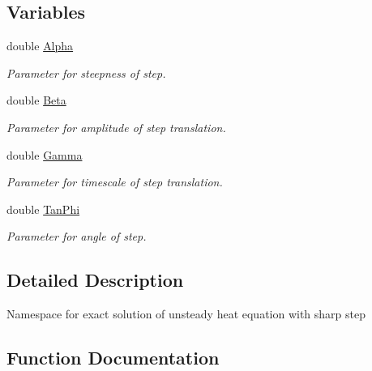 \subsection*{Variables}
\begin{DoxyCompactItemize}
\item 
double \hyperlink{namespaceTanhSolnForUnsteadyHeat_a4c75d9887d6f25405bbead696a94db63}{Alpha}
\begin{DoxyCompactList}\small\item\em Parameter for steepness of step. \end{DoxyCompactList}\item 
double \hyperlink{namespaceTanhSolnForUnsteadyHeat_a66f6116310a5f9f96c2d3bf28250a92b}{Beta}
\begin{DoxyCompactList}\small\item\em Parameter for amplitude of step translation. \end{DoxyCompactList}\item 
double \hyperlink{namespaceTanhSolnForUnsteadyHeat_a5bb742b074ab5f3f65286b1cff1f1512}{Gamma}
\begin{DoxyCompactList}\small\item\em Parameter for timescale of step translation. \end{DoxyCompactList}\item 
double \hyperlink{namespaceTanhSolnForUnsteadyHeat_af8d2e06630e8a3f71d1f8dbeecf8a964}{Tan\+Phi}
\begin{DoxyCompactList}\small\item\em Parameter for angle of step. \end{DoxyCompactList}\end{DoxyCompactItemize}


\subsection{Detailed Description}
Namespace for exact solution of unsteady heat equation with sharp step 

\subsection{Function Documentation}
\mbox{\label{namespaceTanhSolnForUnsteadyHeat_a36857bbdec45f44018772de70558db7d}} 
